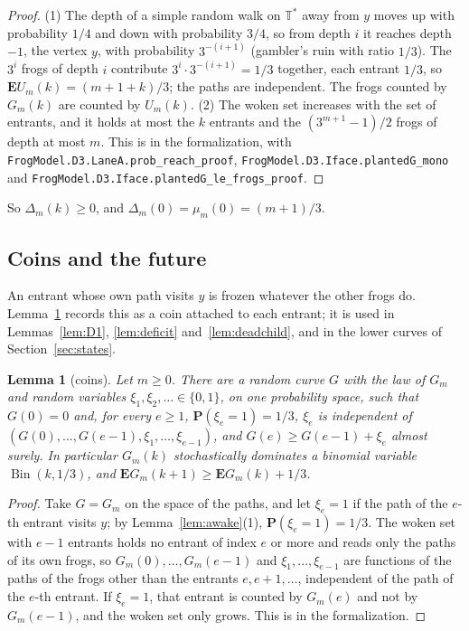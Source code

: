 \documentclass[11pt]{amsart}
\newtheorem{lemma}[theorem]{Lemma}
\theoremstyle{definition}
\numberwithin{equation}{section}
\newcommand{\lean}[1]{\ignorespaces}
\newcommand{\Ts}{\mathbb{T}^{*}}
\newcommand{\E}{\mathbf{E}}
\renewcommand{\P}{\mathbf{P}}
\newcommand{\Bin}{\operatorname{Bin}}
\begin{document}
\begin{proof}
(1) The depth of a simple random walk on $\Ts$ away from $y$ moves up with probability $1/4$ and down with probability $3/4$, so from depth $i$ it reaches depth $-1$, the vertex $y$, with probability $3^{-(i+1)}$ (gambler's ruin with ratio $1/3$). The $3^i$ frogs of depth $i$ contribute $3^i\cdot3^{-(i+1)}=1/3$ together, each entrant $1/3$, so $\E U_m(k)=(m+1+k)/3$; the paths are independent. The frogs counted by $G_m(k)$ are counted by $U_m(k)$. (2) The woken set increases with the set of entrants, and it holds at most the $k$ entrants and the $(3^{m+1}-1)/2$ frogs of depth at most $m$. This is  in the formalization, with \texttt{FrogModel.D3.LaneA.prob\_reach\_proof}, \texttt{FrogModel.D3.Iface.plantedG\_mono} and \texttt{FrogModel.D3.Iface.plantedG\_le\_frogs\_proof}.
\end{proof}

So $\Delta_m(k)\ge0$, and $\Delta_m(0)=\mu_m(0)=(m+1)/3$.

\subsection*{Coins and the future}
An entrant whose own path visits $y$ is frozen whatever the other frogs do. Lemma~\ref{lem:coins} records this as a coin attached to each entrant; it is used in Lemmas~\ref{lem:D1}, \ref{lem:deficit} and~\ref{lem:deadchild}, and in the lower curves of Section~\ref{sec:states}.

\begin{lemma}[coins]\label{lem:coins}\lean{FrogModel.D3.LaneA.coin_coupling_proof, FrogModel.D3.Iface.coin_coupling}
Let $m\ge0$. There are a random curve $G$ with the law of $G_m$ and random variables $\xi_1,\xi_2,\ldots\in\{0,1\}$, on one probability space, such that $G(0)=0$ and, for every $e\ge1$, $\P(\xi_e=1)=1/3$, $\xi_e$ is independent of $(G(0),\dots,G(e-1),\xi_1,\dots,\xi_{e-1})$, and $G(e)\ge G(e-1)+\xi_e$ almost surely. In particular $G_m(k)$ stochastically dominates a binomial variable $\Bin(k,1/3)$, and $\E G_m(k+1)\ge\E G_m(k)+1/3$.
\end{lemma}

\begin{proof}
Take $G=G_m$ on the space of the paths, and let $\xi_e=1$ if the path of the $e$-th entrant visits $y$; by Lemma~\ref{lem:awake}(1), $\P(\xi_e=1)=1/3$. The woken set with $e-1$ entrants holds no entrant of index $e$ or more and reads only the paths of its own frogs, so $G_m(0),\dots,G_m(e-1)$ and $\xi_1,\dots,\xi_{e-1}$ are functions of the paths of the frogs other than the entrants $e,e+1,\dots$, independent of the path of the $e$-th entrant. If $\xi_e=1$, that entrant is counted by $G_m(e)$ and not by $G_m(e-1)$, and the woken set only grows. This is  in the formalization.
\end{proof}
\end{document}
